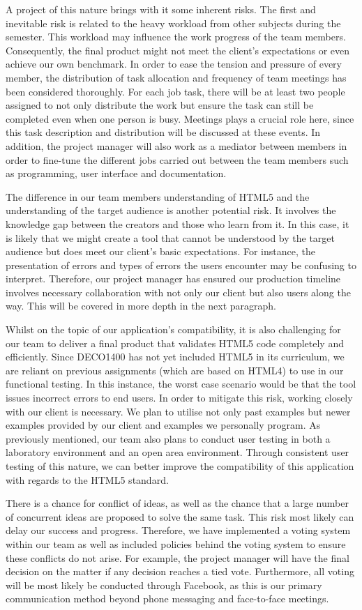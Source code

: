 \documentclass[12pt]{article}
\begin{document}
A project of this nature brings with it some inherent risks. The first and inevitable risk is related to the heavy workload from other subjects during the semester. This workload may influence the work progress of the team members. Consequently, the final product might not meet the client’s expectations or even achieve our own benchmark. In order to ease the tension and pressure of every member, the distribution of task allocation and frequency of team meetings has been considered thoroughly. For each job task, there will be at least two people assigned to not only distribute the work but ensure the task can still be completed even when one person is busy. Meetings plays a crucial role here, since this task description and distribution will be discussed at these events. In addition, the project manager will also work as a mediator between members in order to fine-tune the different jobs carried out between the team members such as programming, user interface and documentation.

The difference in our team members understanding of HTML5 and the understanding of the target audience is another potential risk. It involves the knowledge gap between the creators and those who learn from it. In this case, it is likely that we might create a tool that cannot be understood by the target audience but does meet our client’s basic expectations. For instance, the presentation of errors and types of errors the users encounter may be confusing to interpret. Therefore, our project manager has ensured our production timeline involves necessary collaboration with not only our client but also users along the way. This will be covered in more depth in the next paragraph.

Whilst on the topic of our application's compatibility, it is also challenging for our team to deliver a final product that validates HTML5 code completely and efficiently. Since DECO1400 has not yet included HTML5 in its curriculum, we are reliant on previous assignments (which are based on HTML4) to use in our functional testing. In this instance, the worst case scenario would be that the tool issues incorrect errors to end users. In order to mitigate this risk, working closely with our client is necessary. We plan to utilise not only past examples but newer examples provided by our client and examples we personally program. As previously mentioned, our team also plans to conduct user testing in both a laboratory environment and an open area environment. Through consistent user testing of this nature, we can better improve the compatibility of this application with regards to the HTML5 standard.

There is a chance for conflict of ideas, as well as the chance that a large number of concurrent ideas are proposed to solve the same task. This risk most likely can delay our success and progress. Therefore, we have implemented a voting system within our team as well as included policies behind the voting system to ensure these conflicts do not arise. For example, the project manager will have the final decision on the matter if any decision reaches a tied vote. Furthermore, all voting will be most likely be conducted through Facebook, as this is our primary communication method beyond phone messaging and face-to-face meetings.
\end{document}

